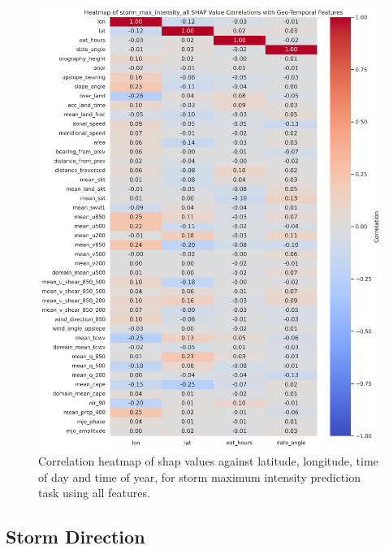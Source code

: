 \begin{figure}[ht]
    \centering
    \includegraphics[width=\textwidth]{../figures/generated/experiments/storm_max_intensity/storm_max_intensity_all_shap_correlation_heatmap.png}
    \caption{Correlation heatmap of \acrshort{shap} values against latitude, longitude, time of day and time of year, for storm maximum intensity prediction task using all features.}
    \label{fig:storm_max_intensity_all_shap_heatmap}
\end{figure}

\clearpage

\subsection{Storm Direction}
\label{appn:shap-heatmaps-sd}

